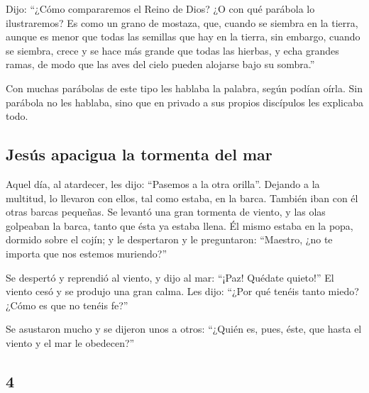\begin{paracol}{2}
 Dijo: ``¿Cómo compararemos el Reino de Dios? ¿O con qué
parábola lo ilustraremos?  Es como un grano de mostaza,
que, cuando se siembra en la tierra, aunque es menor que todas las
semillas que hay en la tierra,  sin embargo, cuando se
siembra, crece y se hace más grande que todas las hierbas, y echa
grandes ramas, de modo que las aves del cielo pueden alojarse bajo su
sombra.''

 Con muchas parábolas de este tipo les hablaba la
palabra, según podían oírla.  Sin parábola no les
hablaba, sino que en privado a sus propios discípulos les explicaba
todo.

\hypertarget{jesuxfas-apacigua-la-tormenta-del-mar}{%
\subsection{Jesús apacigua la tormenta del
mar}\label{jesuxfas-apacigua-la-tormenta-del-mar}}

 Aquel día, al atardecer, les dijo: ``Pasemos a la otra
orilla''.  Dejando a la multitud, lo llevaron con ellos,
tal como estaba, en la barca. También iban con él otras barcas pequeñas.
 Se levantó una gran tormenta de viento, y las olas
golpeaban la barca, tanto que ésta ya estaba llena.  Él
mismo estaba en la popa, dormido sobre el cojín; y le despertaron y le
preguntaron: ``Maestro, ¿no te importa que nos estemos muriendo?''

 Se despertó y reprendió al viento, y dijo al mar:
``¡Paz! Quédate quieto!'' El viento cesó y se produjo una gran calma.
 Les dijo: ``¿Por qué tenéis tanto miedo? ¿Cómo es que no
tenéis fe?''

 Se asustaron mucho y se dijeron unos a otros: ``¿Quién
es, pues, éste, que hasta el viento y el mar le obedecen?''

\switchcolumn
\begin{otherlanguage}{english}

\hypertarget{section-7}{%
\section{4}\label{section-7}}


\end{otherlanguage}
\end{paracol}
